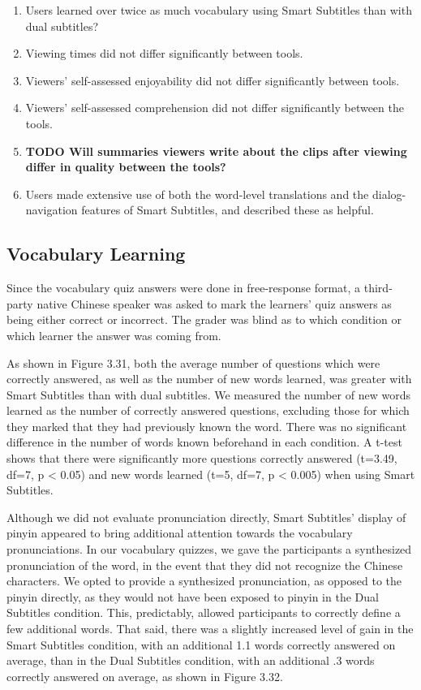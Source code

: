 \documentclass{sigchi}
\begin{document}
\begin{enumerate}[noitemsep]
\item Users learned over twice as much vocabulary using Smart Subtitles than with dual subtitles?
\item Viewing times did not differ significantly between tools.
\item Viewers' self-assessed enjoyability did not differ significantly between tools.
\item Viewers' self-assessed comprehension did not differ significantly between the tools.
\item \textbf{TODO Will summaries viewers write about the clips after viewing differ in quality between the tools?}
\item Users made extensive use of both the word-level translations and the dialog-navigation features of Smart Subtitles, and described these as helpful.
\end{enumerate}

\subsection{Vocabulary Learning}

Since the vocabulary quiz answers were done in free-response format, a third-party native Chinese speaker was asked to mark the learners' quiz answers as being either correct or incorrect. The grader was blind as to which condition or which learner the answer was coming from.

As shown in Figure 3.31, both the average number of questions which were correctly answered, as well as the number of new words learned, was greater with Smart Subtitles than with dual subtitles. We measured the number of new words learned as the number of correctly answered questions, excluding those for which they marked that they had previously known the word. There was no significant difference in the number of words known beforehand in each condition. A t-test shows that there were significantly more questions correctly answered (t=3.49, df=7, p < 0.05) and new words learned (t=5, df=7, p < 0.005) when using Smart Subtitles.

Although we did not evaluate pronunciation directly, Smart Subtitles' display of pinyin appeared to bring additional attention towards the vocabulary pronunciations. In our vocabulary quizzes, we gave the participants a synthesized pronunciation of the word, in the event that they did not recognize the Chinese characters. We opted to provide a synthesized pronunciation, as opposed to the pinyin directly, as they would not have been exposed to pinyin in the Dual Subtitles condition. This, predictably, allowed participants to correctly define a few additional words. That said, there was a slightly increased level of gain in the Smart Subtitles condition, with an additional 1.1 words correctly answered on average, than in the Dual Subtitles condition, with an additional .3 words correctly answered on average, as shown in Figure 3.32.
\end{document}
